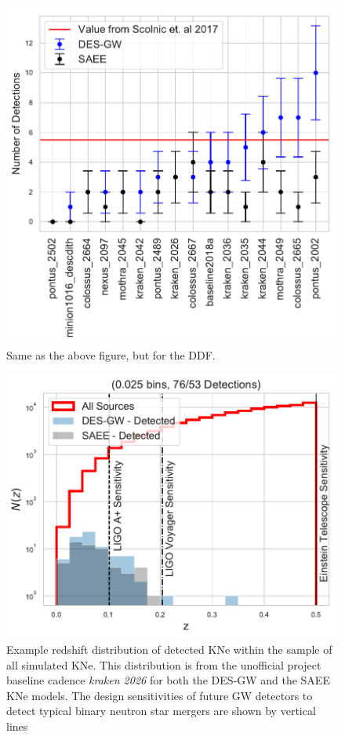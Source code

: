 \begin{figure}[h!]
  \centering
  \includegraphics[scale=0.79]{figures/ddf_detection_counts_by_cadence}
  \caption{Same as the above figure, but for the DDF.}
  \label{fig:cadence_ranking_ddf}
\end{figure}

\begin{figure}[h!]
  \centering
  \includegraphics[scale=0.82]{figures/both_nz_base_kraken_2026}
  \caption{Example redshift distribution of detected KNe within the sample of all simulated KNe. This distribution is from the unofficial project baseline cadence \protect \textit{kraken 2026} for both the DES-GW and the SAEE KNe models. The design sensitivities of future GW detectors to detect typical binary neutron star mergers are shown by vertical lines \citep{Chen2017a, Chamberlain2017, Scolnic2017a}}
  \label{fig:typical_nz}
\end{figure}

\FloatBarrier
